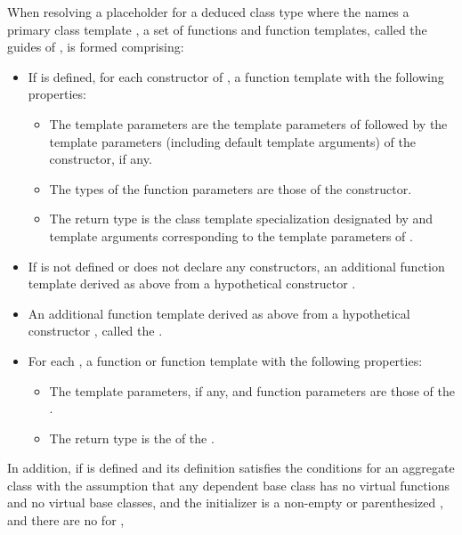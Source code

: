 \pnum
When resolving a placeholder for a deduced class type
where the  names a primary class template ,
a set of functions and function templates, called the guides of ,
is formed comprising:
\begin{itemize}
\item
If  is defined,
for each constructor of ,
a function template with the following properties:
\begin{itemize}
\item
The template parameters are the template parameters of 
followed
by the template parameters (including default template arguments) of the constructor,
if any.
\item
The types of the function parameters are those of the constructor.
\item
The return type is the class template specialization
designated by 
and template arguments
corresponding to the template parameters of .
\end{itemize}

\item
If 
is not defined or does not declare any constructors,
an additional function template derived as above
from a hypothetical constructor .

\item
An additional function template derived as above
from a hypothetical constructor ,
called the .

\item
For each ,
a function or function template
with the following properties:
\begin{itemize}
\item
The template parameters, if any,
and function parameters
are those of the .
\item
The return type
is the 
of the .
\end{itemize}
\end{itemize}
In addition, if  is defined
and its definition satisfies the conditions for
an aggregate class
with the assumption that any dependent base class has
no virtual functions and no virtual base classes, and
the initializer is a non-empty  or
parenthesized , and
there are no  for ,
